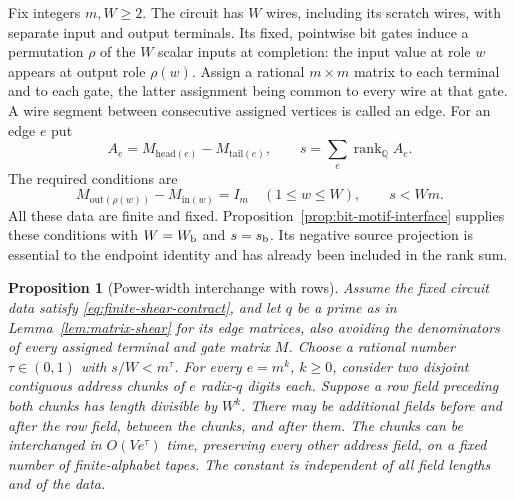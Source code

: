 \documentclass[11pt]{article}
\newtheorem{proposition}[theorem]{Proposition}
\theoremstyle{definition}
\begin{document}
Fix integers $m,W\ge2$.  The circuit has $W$ wires, including its
scratch wires, with separate input and output terminals.  Its fixed,
pointwise bit gates induce a permutation $\rho$ of the $W$ scalar inputs
at completion: the input value at role $w$ appears at output role
$\rho(w)$.  Assign a
rational $m\times m$ matrix to each terminal and to each gate, the latter
assignment being common to every wire at that gate.  A wire segment
between consecutive assigned vertices is called an edge.  For an edge
$e$ put
\[
 A_e=M_{\mathrm{head}(e)}-M_{\mathrm{tail}(e)},
 \qquad s=\sum_e\operatorname{rank}_{\mathbb Q}A_e.
\]
The required conditions are
\begin{equation}
\label{eq:finite-shear-contract}
 M_{\mathrm{out}(\rho(w))}-M_{\mathrm{in}(w)}=I_m
 \quad(1\le w\le W),\qquad s<Wm.
\end{equation}
All these data are finite and fixed. Proposition~\ref{prop:bit-motif-interface}
supplies these conditions with $W=W_{\rm b}$ and $s=s_{\rm b}$.
Its negative source projection is essential to the endpoint identity and
has already been included in the rank sum.

\begin{proposition}[Power-width interchange with rows]
\label{prop:power-interchange}
Assume the fixed circuit data satisfy
\eqref{eq:finite-shear-contract}, and let $q$ be a prime as in
Lemma~\ref{lem:matrix-shear} for its edge matrices, also avoiding the
denominators of every assigned terminal and gate matrix $M$.
Choose a rational number $\tau\in(0,1)$ with $s/W<m^\tau$.
For every $e=m^k$, $k\ge0$, consider two disjoint contiguous address
chunks of $e$ radix-$q$ digits each.  Suppose a row field preceding both
chunks has length divisible by $W^k$.  There may be additional fields
before and after the row field, between the chunks, and after them.
The chunks can be interchanged in $O(Ve^\tau)$ time, preserving every
other address field, on a fixed number of finite-alphabet tapes.
The constant is independent of all field lengths and of the data.
\end{proposition}
\end{document}
